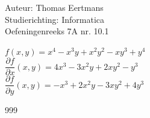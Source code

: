 \documentclass[a4paper]{article}
\begin{document}
  
\noindent \large Auteur: Thomas Eertmans \\
\noindent \large Studierichting: Informatica\\
\noindent \large Oefeningenreeks 7A nr. 10.1\\

\medskip

\normalsize

$f(x,y) = x^4-x^3y+x^2y^2-xy^3+y^4$ \\

$\dfrac{\partial f}{\partial x}(x,y) = 4x^3-3x^2y+2xy^2-y^3$ \\

$\dfrac{\partial f}{\partial y}(x,y) = -x^3+2x^2y-3xy^2+4y^3$

\begin{thebibliography}{999}
\end{thebibliography}
\end{document}
